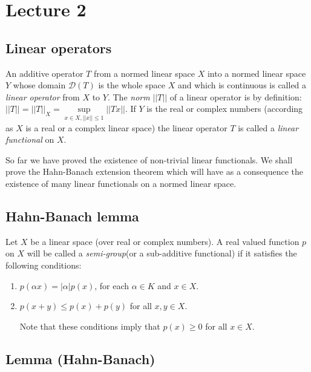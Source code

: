 \chapter{Lecture 2}\label{chap2}

\section{Linear operators}\label{chap2:sec1}\pageoriginale

\begin{defi*}%
 An additive operator $T$ from a normed linear space $X$ into a
 normed linear space $Y$ whose domain $\mathscr{D}(T)$ is the whole
 space $X$ and which is continuous is called a {\em linear operator}
 from $X$ to $Y$. The \textit{norm }$|| T ||$ of a linear operator is
 by definition: $|| T || = || T ||_X = \sup\limits_{x \in X, || x ||
  \le 1} || Tx ||$. If $Y$ is the real or complex numbers (according
 as $X$ is a real or a complex linear space) the linear operator $T$
 is called a {\em linear functional} on $X$. 
\end{defi*}

So far we have proved the existence of non-trivial linear
functionals. We shall prove the Hahn-Banach extension theorem which
will have as a consequence the existence of many linear functionals on
a normed linear space. 

\section{Hahn-Banach lemma}\label{chap2:sec2}

\begin{defi*}%
 Let $X$ be a linear space (over real or complex numbers). A real
 valued function $p$ on $X$ will be called a {\em semi-group}(or a
 sub-additive functional) if it satisfies the following conditions: 
 \begin{enumerate}[\rm i)]
 \item $p(\alpha x) = | \alpha | p(x)$, for each $\alpha \in K$ and
  $x \in X$. 
 \item $p(x + y) \le p(x) + p(y)$ for all $x, y \in X$.

  Note that these conditions imply that $p(x) \ge 0$ for all $x \in X$.
 \end{enumerate}
\end{defi*}

\section{Lemma (Hahn-Banach)}\label{chap2:sec3}

